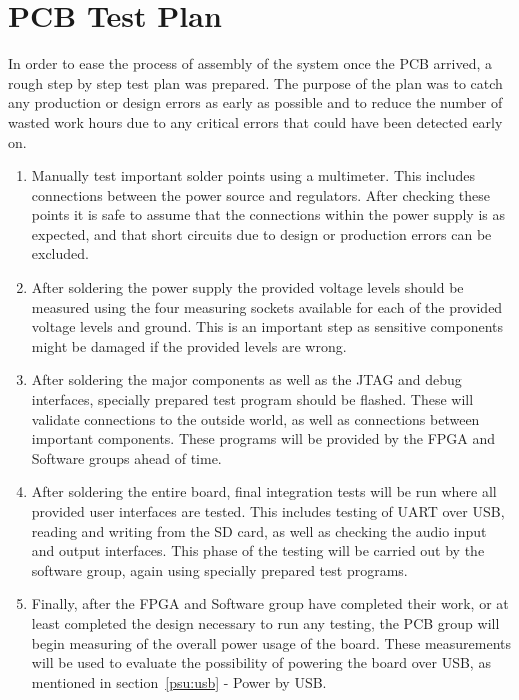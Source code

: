 
\section{PCB Test Plan}

In order to ease the process of assembly of the system once the PCB arrived, a
rough step by step test plan was prepared. The purpose of the plan was to catch
any production or design errors as early as possible and to reduce the number of
wasted work hours due to any critical errors that could have been detected early
on.

\begin{enumerate}
    \item Manually test important solder points using a multimeter. This 
    includes connections between the power source and regulators. After 
    checking these points it is safe to assume that the connections within
    the power supply is as expected, and that short circuits due to design
    or production errors can be excluded.
    \item After soldering the power supply the provided voltage levels should
    be measured using the four measuring sockets available for each of the
    provided voltage levels and ground. This is an important step as sensitive
    components might be damaged if the provided levels are wrong. 
    \item After soldering the major components as well as the JTAG and debug
    interfaces, specially prepared test program should be flashed. These will
    validate connections to the outside world, as well as connections between 
    important components. These programs will be provided by the FPGA and 
    Software groups ahead of time.
    \item After soldering the entire board, final integration tests will be run where all
    provided user interfaces are tested. This includes testing of UART over 
    USB, reading and writing from the SD card, as well as checking the audio input and output interfaces. This phase of 
    the testing will be carried out by the software group, again using specially
    prepared test programs.
    \item Finally, after the FPGA and Software group have completed their work,
    or at least completed the design necessary to run any testing, the PCB group
    will begin measuring of the overall power usage of the board. These measurements
    will be used to evaluate the possibility of powering the board over USB, as 
    mentioned in section~\ref{psu:usb} - Power by USB.
\end{enumerate}
